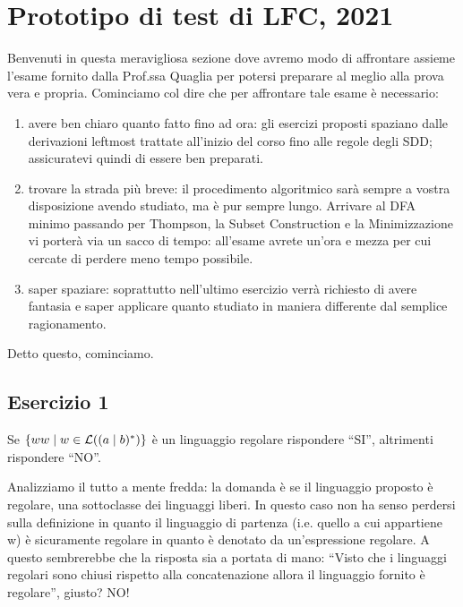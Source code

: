 \documentclass[class=book, crop=false, oneside, 12pt]{standalone}
\begin{document}
\chapter{Prototipo di test di LFC, 2021}


Benvenuti in questa meravigliosa sezione dove avremo modo di affrontare assieme l'esame fornito dalla Prof.ssa Quaglia per potersi preparare al meglio alla prova vera e propria. Cominciamo col dire che per affrontare tale esame è necessario:

\begin{enumerate}
    \item avere ben chiaro quanto fatto fino ad ora: gli esercizi proposti spaziano dalle derivazioni leftmost trattate all'inizio del corso fino alle regole degli SDD; assicuratevi quindi di essere ben preparati.
    \item trovare la strada più breve: il procedimento algoritmico sarà sempre a vostra disposizione avendo studiato, ma è pur sempre lungo. Arrivare al DFA minimo passando per Thompson, la Subset Construction e la Minimizzazione vi porterà via un sacco di tempo: all'esame avrete un'ora e mezza per cui cercate di perdere meno tempo possibile.
    \item saper spaziare: soprattutto nell'ultimo esercizio verrà richiesto di avere fantasia e saper applicare quanto studiato in maniera differente dal semplice ragionamento.
\end{enumerate}

Detto questo, cominciamo.

\section*{Esercizio 1}

Se \(\{ww \mid w \in \mathcal{L}((a \mid b)^*)\}\) è un linguaggio regolare rispondere “SI”, altrimenti rispondere “NO”.

Analizziamo il tutto a mente fredda: la domanda è se il linguaggio proposto è regolare, una sottoclasse dei linguaggi liberi. In questo caso non ha senso perdersi sulla definizione in quanto il linguaggio di partenza (i.e. quello a cui appartiene w) è sicuramente regolare in quanto è denotato da un'espressione regolare. A questo sembrerebbe che la risposta sia a portata di mano: “Visto che i linguaggi regolari sono chiusi rispetto alla concatenazione allora il linguaggio fornito è regolare”, giusto? NO! 
\end{document}
